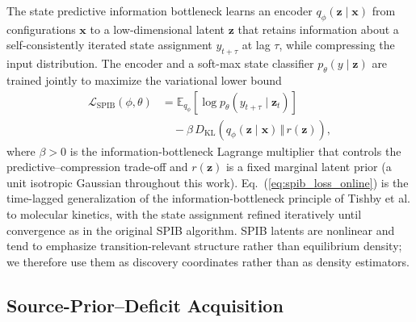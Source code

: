 \documentclass[journal=jctcce,manuscript=article,layout=twocolumn]{achemso}
\begin{document}
The state predictive information bottleneck\cite{wang2021spib} learns an encoder $q_\phi(\mathbf{z}\mid\mathbf{x})$ from configurations $\mathbf{x}$ to a low-dimensional latent $\mathbf{z}$ that retains information about a self-consistently iterated state assignment $y_{t+\tau}$ at lag $\tau$, while compressing the input distribution. The encoder and a soft-max state classifier $p_\theta(y\mid\mathbf{z})$ are trained jointly to maximize the variational lower bound
\begin{equation}
\begin{split}
    \mathcal{L}_{\mathrm{SPIB}}(\phi,\theta) &=
    \mathbb{E}_{q_\phi}\!\left[\log p_\theta(y_{t+\tau}\mid \mathbf{z}_t)\right] \\
    &\quad - \beta\,D_{\mathrm{KL}}\!\left(q_\phi(\mathbf{z}\mid\mathbf{x})\,\Vert\,r(\mathbf{z})\right),
\end{split}
    \label{eq:spib_loss_online}
\end{equation}
where $\beta>0$ is the information-bottleneck Lagrange multiplier that controls the predictive--compression trade-off and $r(\mathbf{z})$ is a fixed marginal latent prior (a unit isotropic Gaussian throughout this work). Eq.~(\ref{eq:spib_loss_online}) is the time-lagged generalization of the information-bottleneck principle of Tishby et al.\cite{tishby2000information} to molecular kinetics, with the state assignment refined iteratively until convergence as in the original SPIB algorithm. SPIB latents are nonlinear and tend to emphasize transition-relevant structure rather than equilibrium density; we therefore use them as discovery coordinates rather than as density estimators.

\subsection{Source-Prior--Deficit Acquisition}
\label{sec:theory_score_online}
\end{document}
